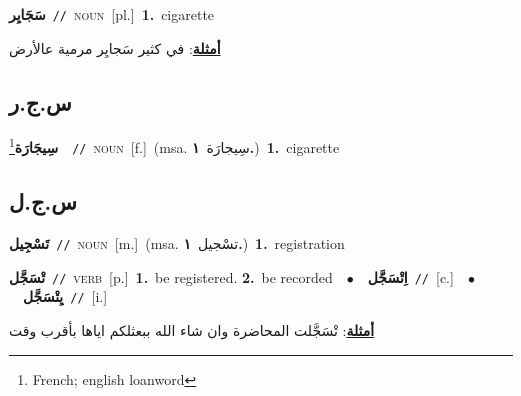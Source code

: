 \documentclass[10pt,a4paper,twoside]{article} %
\begin{document}
\begin{multicols}{2}
{\setlength\topsep{0pt}\textbf{\foreignlanguage{arabic}{سَجَايِر}}\ {\color{gray}\texttt{//}\color{black}}\ \textsc{noun}\ [pl.]\ \textbf{1.}~cigarette\  \begin{flushright}\color{gray}\foreignlanguage{arabic}{\textbf{\underline{\foreignlanguage{arabic}{أمثلة}}}: في كثير سَجايِر مرمية عالأرض}\end{flushright}\color{black}} \vspace{2mm}

\vspace{-3mm}
\subsection*{\color{blue}\foreignlanguage{arabic}{س.ج.ر}\color{blue}{ (ntws)}} 

{\setlength\topsep{0pt}\textbf{\foreignlanguage{arabic}{سِيجَارَة}}\footnote{French; english loanword}\ \ {\color{gray}\texttt{//}\color{black}}\ \textsc{noun}\ [f.]\ \color{gray}(msa. \foreignlanguage{arabic}{سِيجارَة}~\foreignlanguage{arabic}{\textbf{١.}})\color{black}\ \textbf{1.}~cigarette\ } \vspace{2mm}

\vspace{-3mm}
\subsection*{\color{blue}\foreignlanguage{arabic}{س.ج.ل}\color{blue}{}} 

{\setlength\topsep{0pt}\textbf{\foreignlanguage{arabic}{تَسْجِيل}}\ {\color{gray}\texttt{//}\color{black}}\ \textsc{noun}\ [m.]\ \color{gray}(msa. \foreignlanguage{arabic}{تسْجيل}~\foreignlanguage{arabic}{\textbf{١.}})\color{black}\ \textbf{1.}~registration\ } \vspace{2mm}

{\setlength\topsep{0pt}\textbf{\foreignlanguage{arabic}{تْسَجَّل}}\ {\color{gray}\texttt{//}\color{black}}\ \textsc{verb}\ [p.]\ \textbf{1.}~be registered.  \textbf{2.}~be recorded\ \ $\bullet$\ \ \setlength\topsep{0pt}\textbf{\foreignlanguage{arabic}{اِتْسَجَّل}}\ {\color{gray}\texttt{//}\color{black}}\ [c.]\ \ $\bullet$\ \ \setlength\topsep{0pt}\textbf{\foreignlanguage{arabic}{يِتْسَجَّل}}\ {\color{gray}\texttt{//}\color{black}}\ [i.]\  \begin{flushright}\color{gray}\foreignlanguage{arabic}{\textbf{\underline{\foreignlanguage{arabic}{أمثلة}}}: تْسَجَّلت المحاضرة وان شاء الله ببعثلكم اياها بأقرب وقت}\end{flushright}\color{black}} \vspace{2mm}


\end{multicols}
\end{document}
